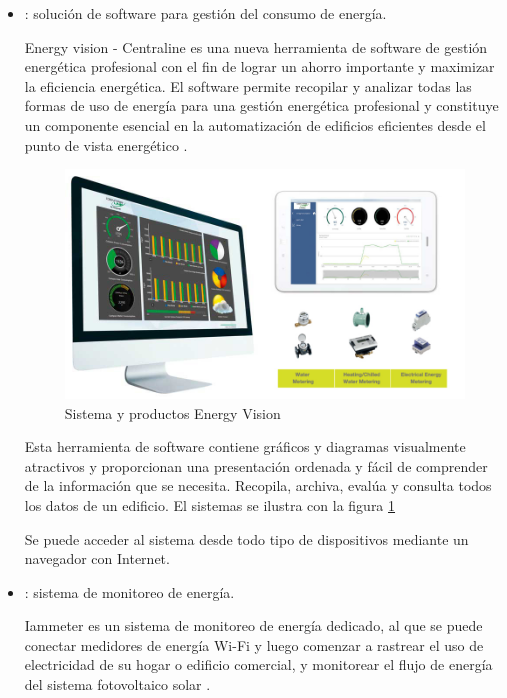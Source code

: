 \begin{itemize}
\item {}: solución de software para gestión del consumo de energía.

Energy vision - Centraline es una nueva herramienta de software de gestión energética profesional con el fin de lograr un ahorro importante y maximizar la eficiencia energética. El software permite recopilar y analizar todas las formas de uso de energía para una gestión energética profesional y constituye un componente esencial en la automatización de edificios eficientes desde el punto de vista energético \citep{WEBSITE:13}.

\begin{figure}[htbp]
\centering
\includegraphics[width=.8\textwidth]{./Figures/energy-vision.jpg}
\caption{Sistema y productos Energy Vision \protect\footnotemark}
\label{fig:energy-vision}
\end{figure}


Esta herramienta de software contiene gráficos y diagramas visualmente atractivos y proporcionan una presentación ordenada y fácil de comprender de la información que se necesita. Recopila, archiva, evalúa y consulta todos los datos de un edificio. El sistemas se ilustra con la figura \ref{fig:energy-vision}

Se puede acceder al sistema desde todo tipo de dispositivos mediante un navegador con Internet.

\vspace{1cm}
\vspace{1cm}

\item {}: sistema de monitoreo de energía.

Iammeter es un sistema de monitoreo de energía dedicado, al que se puede conectar medidores de energía Wi-Fi y luego comenzar a rastrear el uso de electricidad de su hogar o edificio comercial, y monitorear el flujo de energía del sistema fotovoltaico solar \citep{WEBSITE:11}.


\end{itemize}
